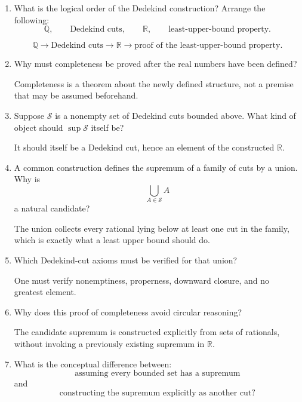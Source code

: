\documentclass{self-check}
\begin{document}
\begin{enumerate}[label=\arabic{*}., itemsep=10pt]
  \item What is the logical order of the Dedekind construction? Arrange the following:
    \[ \mathbb{Q},\qquad \text{Dedekind cuts},\qquad \mathbb{R},\qquad \text{least-upper-bound property}. \]

    \begin{answer}
      \[ \mathbb{Q}\longrightarrow \text{Dedekind cuts}\longrightarrow \mathbb{R}\longrightarrow \text{proof of the least-upper-bound property}. \]
    \end{answer}
  \item Why must completeness be proved after the real numbers have been defined?

    \begin{answer}
      Completeness is a theorem about the newly defined structure, not a premise that may be assumed beforehand.
    \end{answer}
  \item Suppose \(\mathcal{S}\) is a nonempty set of Dedekind cuts bounded above. What kind of object should \(\sup \mathcal{S}\) itself be?

    \begin{answer}
      It should itself be a Dedekind cut, hence an element of the constructed \(\mathbb{R}\).
    \end{answer}
  \item A common construction defines the supremum of a family of cuts by a union. Why is
    \[ \bigcup_{A\in\mathcal{S}}A \]
    a natural candidate?

    \begin{answer}
      The union collects every rational lying below at least one cut in the family, which is exactly what a least upper bound should do.
    \end{answer}
  \item Which Dedekind-cut axioms must be verified for that union?

    \begin{answer}
      One must verify nonemptiness, properness, downward closure, and no greatest element.
    \end{answer}
  \item Why does this proof of completeness avoid circular reasoning?

    \begin{answer}
      The candidate supremum is constructed explicitly from sets of rationals, without invoking a previously existing supremum in \(\mathbb{R}\).
    \end{answer}
  \item What is the conceptual difference between:
    \[ \text{assuming every bounded set has a supremum} \]
    and
    \[ \text{constructing the supremum explicitly as another cut}? \]


\end{enumerate}
\end{document}
